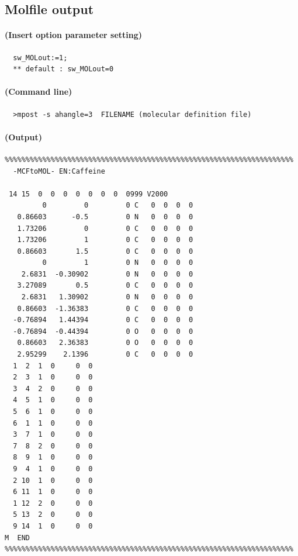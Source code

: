 \documentclass[a4paper]{article}
\begin{document}
\subsection{Molfile output}
\paragraph{(Insert option parameter setting)}
\begin{verbatim}
  sw_MOLout:=1;
  ** default : sw_MOLout=0
\end{verbatim}
\paragraph{(Command line)}
\begin{verbatim}
  >mpost -s ahangle=3  FILENAME (molecular definition file)
\end{verbatim}
\paragraph{(Output)}
\begin{verbatim}
%%%%%%%%%%%%%%%%%%%%%%%%%%%%%%%%%%%%%%%%%%%%%%%%%%%%%%%%%%%%%%%%%%%%%
  -MCFtoMOL- EN:Caffeine         

 14 15  0  0  0  0  0  0  0  0999 V2000
         0         0         0 C   0  0  0  0
   0.86603      -0.5         0 N   0  0  0  0
   1.73206         0         0 C   0  0  0  0
   1.73206         1         0 C   0  0  0  0
   0.86603       1.5         0 C   0  0  0  0
         0         1         0 N   0  0  0  0
    2.6831  -0.30902         0 N   0  0  0  0
   3.27089       0.5         0 C   0  0  0  0
    2.6831   1.30902         0 N   0  0  0  0
   0.86603  -1.36383         0 C   0  0  0  0
  -0.76894   1.44394         0 C   0  0  0  0
  -0.76894  -0.44394         0 O   0  0  0  0
   0.86603   2.36383         0 O   0  0  0  0
   2.95299    2.1396         0 C   0  0  0  0
  1  2  1  0     0  0
  2  3  1  0     0  0
  3  4  2  0     0  0
  4  5  1  0     0  0
  5  6  1  0     0  0
  6  1  1  0     0  0
  3  7  1  0     0  0
  7  8  2  0     0  0
  8  9  1  0     0  0
  9  4  1  0     0  0
  2 10  1  0     0  0
  6 11  1  0     0  0
  1 12  2  0     0  0
  5 13  2  0     0  0
  9 14  1  0     0  0
M  END
%%%%%%%%%%%%%%%%%%%%%%%%%%%%%%%%%%%%%%%%%%%%%%%%%%%%%%%%%%%%%%%%%%%%%
\end{verbatim}%
\newpage
\end{document}
